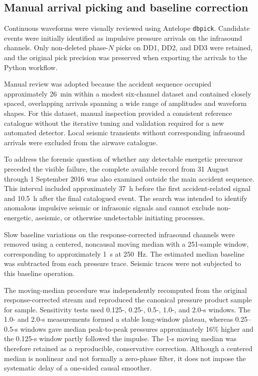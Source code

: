\documentclass[]{seismica}
\begin{document}
\subsection{Manual arrival picking and baseline correction}

Continuous waveforms were visually reviewed using Antelope \texttt{dbpick}. Candidate events were initially identified as impulsive pressure arrivals on the infrasound channels. Only non-deleted phase-$N$ picks on DD1, DD2, and DD3 were retained, and the original pick precision was preserved when exporting the arrivals to the Python workflow.

Manual review was adopted because the accident sequence occupied approximately 26~min within a modest six-channel dataset and contained closely spaced, overlapping arrivals spanning a wide range of amplitudes and waveform shapes. For this dataset, manual inspection provided a consistent reference catalogue without the iterative tuning and validation required for a new automated detector. Local seismic transients without corresponding infrasound arrivals were excluded from the airwave catalogue.

To address the forensic question of whether any detectable energetic precursor
preceded the visible failure, the complete available record from 31 August
through 1 September 2016 was also examined outside the main accident sequence.
This interval included approximately 37~h before the first accident-related
signal and 10.5~h after the final catalogued event. The search was intended to
identify anomalous impulsive seismic or infrasonic signals and cannot exclude
non-energetic, aseismic, or otherwise undetectable initiating processes.

Slow baseline variations on the response-corrected infrasound channels were removed using a centered, noncausal moving median with a 251-sample window, corresponding to approximately 1~s at 250~Hz. The estimated median baseline was subtracted from each pressure trace. Seismic traces were not subjected to this baseline operation.

The moving-median procedure was independently recomputed from the original
response-corrected stream and reproduced the canonical pressure product sample
for sample. Sensitivity tests used 0.125-, 0.25-, 0.5-, 1.0-, and 2.0-s
windows. The 1.0- and 2.0-s measurements formed a stable long-window plateau,
whereas 0.25--0.5-s windows gave median peak-to-peak pressures approximately
16\% higher and the 0.125-s window partly followed the impulse. The 1-s moving
median was therefore retained as a reproducible, conservative correction.
Although a centered median is nonlinear and not formally a zero-phase filter,
it does not impose the systematic delay of a one-sided causal smoother.
\end{document}
